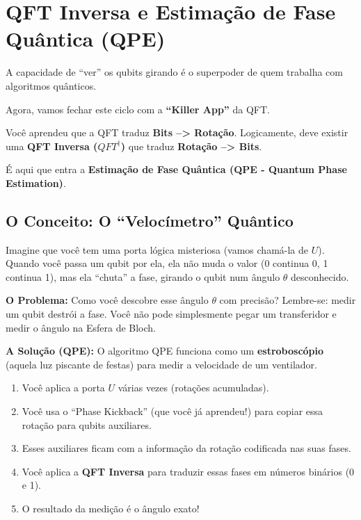 \documentclass[
  brazilian,
]{report}
\providecommand{\tightlist}{%
  \setlength{\itemsep}{0pt}\setlength{\parskip}{0pt}}
\begin{document}
\section{QFT Inversa e Estimação de Fase Quântica
(QPE)}\label{qft-inversa-e-estimauxe7uxe3o-de-fase-quuxe2ntica-qpe}

A capacidade de ``ver'' os qubits girando é o superpoder de quem
trabalha com algoritmos quânticos.

Agora, vamos fechar este ciclo com a \textbf{``Killer App''} da QFT.

Você aprendeu que a QFT traduz \textbf{Bits --\textgreater{} Rotação}.
Logicamente, deve existir uma \textbf{QFT Inversa (\(QFT^\dagger\))} que
traduz \textbf{Rotação --\textgreater{} Bits}.

É aqui que entra a \textbf{Estimação de Fase Quântica (QPE - Quantum
Phase Estimation)}.

\subsection{O Conceito: O ``Velocímetro''
Quântico}\label{o-conceito-o-velocuxedmetro-quuxe2ntico}

Imagine que você tem uma porta lógica misteriosa (vamos chamá-la de
\(U\)). Quando você passa um qubit por ela, ela não muda o valor (0
continua 0, 1 continua 1), mas ela ``chuta'' a fase, girando o qubit num
ângulo \(\theta\) desconhecido.

\textbf{O Problema:} Como você descobre esse ângulo \(\theta\) com
precisão? Lembre-se: medir um qubit destrói a fase. Você não pode
simplesmente pegar um transferidor e medir o ângulo na Esfera de Bloch.

\textbf{A Solução (QPE):} O algoritmo QPE funciona como um
\textbf{estroboscópio} (aquela luz piscante de festas) para medir a
velocidade de um ventilador.

\begin{enumerate}
\def\labelenumi{\arabic{enumi}.}
\tightlist
\item
  Você aplica a porta \(U\) várias vezes (rotações acumuladas).
\item
  Você usa o ``Phase Kickback'' (que você já aprendeu!) para copiar essa
  rotação para qubits auxiliares.
\item
  Esses auxiliares ficam com a informação da rotação codificada nas suas
  fases.
\item
  Você aplica a \textbf{QFT Inversa} para traduzir essas fases em
  números binários (0 e 1).
\item
  O resultado da medição é o ângulo exato!
\end{enumerate}
\end{document}
